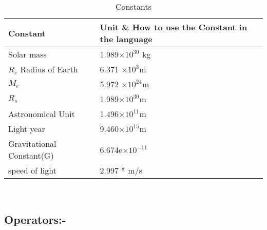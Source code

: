 \documentclass[11pt]{article}
\begin{document}
\begin{table}

\begin{tabular}{|m{3in}|m{3in}|}
\hline
\textbf{Constant} & \textbf{Unit} \& \textbf{ How to use the Constant in the language}\\
\hline
Solar mass & 1.989$\times 10^{30}$ kg\\
\hline
$R_e$ Radius of Earth & 6.371 $\times 10^3$m\\
\hline
$M_e$ & 5.972 $\times 10^{24}$m\\
\hline
$R_s$ & 1.989$\times 10^{30}$m\\
\hline
Astronomical Unit & 1.496$\times 10^{11}$m\\
\hline
Light year & 9.460$\times 10^{15}$m\\
\hline
Gravitational Constant(G) & 6.674e$\times 10^{-11}$\\
\hline
speed of light & 2.997 $\time 10^8$ m/s \\
\hline
\end{tabular}\\
\caption{Constants }
\label{Constant values in language}
\end{table}


\subsection{Operators:-}
\end{document}
